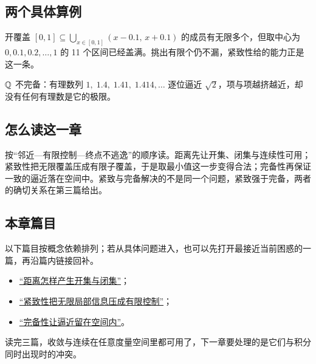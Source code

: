 \subsection{两个具体算例}

开覆盖 \([0,1]\subseteq\bigcup_{x\in[0,1]}(x-0.1,\,x+0.1)\) 的成员有无限多个，但取中心为 \(0,0.1,0.2,\dots,1\) 的 11 个区间已经盖满。挑出有限个仍不漏，紧致性给的能力正是这一条。

\(\mathbb{Q}\) 不完备：有理数列 \(1,\;1.4,\;1.41,\;1.414,\dots\) 逐位逼近 \(\sqrt2\)，项与项越挤越近，却没有任何有理数是它的极限。

\subsection{怎么读这一章}

按``邻近—有限控制—终点不逃逸''的顺序读。距离先让开集、闭集与连续性可用；紧致性把无限覆盖压成有限子覆盖，于是取最小值这一步变得合法；完备性再保证一致的逼近落在空间中。紧致与完备解决的不是同一个问题，紧致强于完备，两者的确切关系在第三篇给出。

\subsection{本章篇目}

以下篇目按概念依赖排列；若从具体问题进入，也可以先打开最接近当前困惑的一篇，再沿篇内链接回补。

\begin{itemize}
\tightlist
\item \hyperref[sec:12-Real-Analysis-Support/03-Topology-Basics/01]{``距离怎样产生开集与闭集''}；
\item \hyperref[sec:12-Real-Analysis-Support/03-Topology-Basics/02]{``紧致性把无限局部信息压成有限控制''}；
\item \hyperref[sec:12-Real-Analysis-Support/03-Topology-Basics/03]{``完备性让逼近留在空间内''}。
\end{itemize}

读完三篇，收敛与连续在任意度量空间里都可用了，下一章要处理的是它们与积分同时出现时的冲突。

